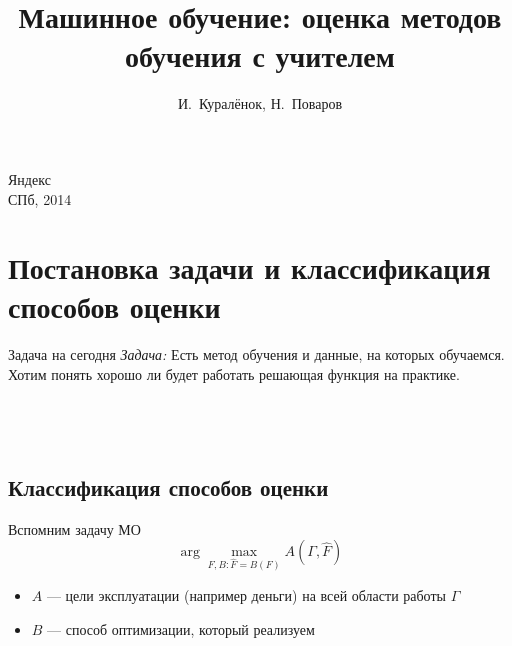 \documentclass[14pt, fleqn, xcolor={dvipsnames, table}]{beamer}
\title{Машинное обучение: оценка методов обучения с учителем\\\small{}}
\author[]{\small{%
И.~Куралёнок,
Н.~Поваров}}
\date{}
\begin{document}
\begin{frame}
\maketitle
\small
\begin{center}
\vspace{-60pt}
\normalsize {\color{red}Я}ндекс \\
\vspace{80pt}
\footnotesize СПб, 2014
\end{center}
\end{frame}

\section{Постановка задачи и классификация способов оценки}
\begin{frame}{Задача на сегодня}
\emph{Задача:} Есть метод обучения и данные, на которых обучаемся. Хотим понять хорошо ли будет работать решающая функция на практике.\\

 \\
 \\

 \\
\end{frame}

\subsection{Классификация способов оценки}

\begin{frame}{Вспомним задачу МО}
$$
\arg \max_{F, B: \hat{F} = B(F)} A(\Gamma, \hat{F})
$$
\begin{itemize}
  \item $A$ --- цели эксплуатации (например деньги) на всей области работы $\Gamma$
  \item $B$ --- способ оптимизации, который реализуем
\end{itemize}

\end{frame}
\end{document}
